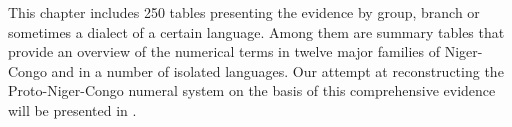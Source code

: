 This chapter includes 250 tables presenting the evidence by group, branch or sometimes a dialect of a certain language. Among them are summary tables that provide an overview of the numerical terms in twelve major families of Niger-Congo and in a number of isolated languages. Our attempt at reconstructing the Proto-Niger-Congo numeral system on the basis of this comprehensive evidence will be presented in .

